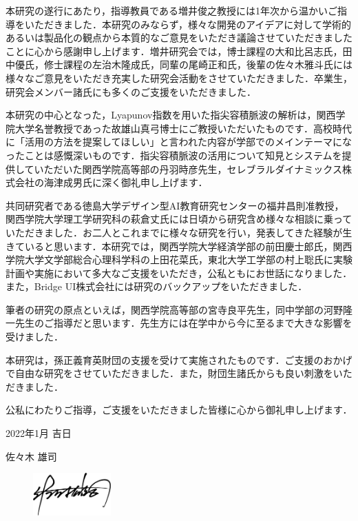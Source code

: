 \begin{acknowledgment}

本研究の遂行にあたり，指導教員である増井俊之教授には1年次から温かいご指導をいただきました．本研究のみならず，様々な開発のアイデアに対して学術的あるいは製品化の観点から本質的なご意見をいただき議論させていただきましたことに心から感謝申し上げます．増井研究会では，博士課程の大和比呂志氏，田中優氏，修士課程の左治木隆成氏，同輩の尾崎正和氏，後輩の佐々木雅斗氏には様々なご意見をいただき充実した研究会活動をさせていただきました．卒業生，研究会メンバー諸氏にも多くのご支援をいただきました．

本研究の中心となった，Lyapunov指数を用いた指尖容積脈波の解析は，関西学院大学名誉教授であった故雄山真弓博士にご教授いただいたものです．高校時代に「活用の方法を提案してほしい」と言われた内容が学部でのメインテーマになったことは感慨深いものです．指尖容積脈波の活用について知見とシステムを提供していただいた関西学院高等部の丹羽時彦先生，セレブラルダイナミックス株式会社の海津成男氏に深く御礼申し上げます．

共同研究者である徳島大学デザイン型AI教育研究センターの福井昌則准教授，関西学院大学理工学研究科の萩倉丈氏には日頃から研究含め様々な相談に乗っていただきました．お二人とこれまでに様々な研究を行い，発表してきた経験が生きていると思います．本研究では，関西学院大学経済学部の前田慶士郎氏，関西学院大学文学部総合心理科学科の上田花菜氏，東北大学工学部の村上聡氏に実験計画や実施において多大なご支援をいただき，公私ともにお世話になりました．また，Bridge UI株式会社には研究のバックアップをいただきました．

筆者の研究の原点といえば，関西学院高等部の宮寺良平先生，同中学部の河野隆一先生のご指導だと思います．先生方には在学中から今に至るまで大きな影響を受けました．

本研究は，孫正義育英財団の支援を受けて実施されたものです．ご支援のおかげで自由な研究をさせていただきました．また，財団生諸氏からも良い刺激をいただきました．

公私にわたりご指導，ご支援をいただきました皆様に心から御礼申し上げます．

\begin{flushright}
2022年1月 吉日

佐々木 雄司
\end{flushright}

\begin{figure}[htbp]
    \begin{flushright}
       \includegraphics[width=30mm]{img/signature.jpeg}
    \end{flushright}
\end{figure}

\end{acknowledgment}
